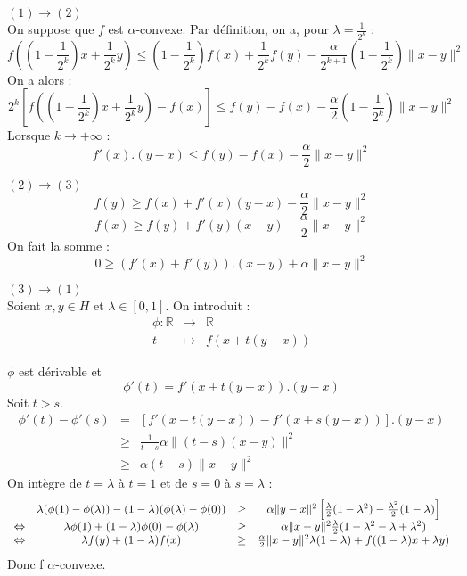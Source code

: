 \begin{dem}
$(1)\to(2)$\\
On suppose que $f$ est $\alpha$-convexe. Par définition, on a, pour $\lambda=\frac{1}{2^k}$ : 
\[f\left(\left(1-\frac{1}{2^k}\right)x+\frac{1}{2^k}y\right)\leq \left(1-\frac{1}{2^k}\right) f(x)+\frac{1}{2^k}f(y)-\frac{\alpha}{2^{k+1}}\left(1-\frac{1}{2^k}\right)\|x-y\|^2\]
On a alors :
\[2^k\left[f\left(\left(1-\frac{1}{2^k}\right)x+\frac{1}{2^k}y\right)-f(x)\right]\leq f(y)-f(x)-\frac{\alpha}{2}\left(1-\frac{1}{2^k}\right)\|x-y\|^2\]
Lorsque $k\to +\infty$ : 
\[f'(x).(y-x)\leq f(y)-f(x)-\frac{\alpha}{2}\|x-y\|^2\]

\bigskip
$(2)\to (3)$\\
\[f(y)\geq f(x)+f'(x)(y-x)-\frac{\alpha}{2}\|x-y\|^2\]
\[f(x)\geq f(y)+f'(y)(x-y)-\frac{\alpha}{2}\|x-y\|^2\]
On fait la somme :
\[0\geq (f'(x)+f'(y)).(x-y)+\alpha\|x-y\|^2\]

\bigskip
$(3)\to(1)$\\
Soient $x,y\in H$ et $\lambda\in[0,1]$. On introduit :
\begin{eqnarray*}
\phi : \mathbb{R}&\to&\mathbb{R}\\
	t&\mapsto&f(x+t(y-x))
\end{eqnarray*}

$\phi$ est dérivable et \[\phi'(t)=f'(x+t(y-x)).(y-x)\]
Soit $t>s$. 
\begin{eqnarray*}
\phi'(t)-\phi'(s)&=&[f'(x+t(y-x))-f'(x+s(y-x))].(y-x) \\
	&\geq& \frac{1}{t-s}\alpha\|(t-s)(x-y)\|^2\\
	&\geq& \alpha(t-s)\|x-y\|^2
\end{eqnarray*}
On intègre de $t=\lambda$ à $t=1$ et de $s=0$ à $s=\lambda$ :
\[\begin{array}{c c c c}
 & \lambda(\phi(1)-\phi(\lambda))-(1-\lambda)(\phi(\lambda)-\phi(0)) &\geq& \alpha\|y-x\|^2\left[ \frac{\lambda}{2} (1-\lambda^2) - \frac{\lambda^2}{2}(1-\lambda)\right]\\
\Leftrightarrow & \lambda\phi(1)+(1-\lambda)\phi(0)-\phi(\lambda) &\geq& \alpha\|x-y\|^2\frac{\lambda}{2}(1-\lambda^2-\lambda+\lambda^2)\\
\Leftrightarrow & \lambda f(y) + (1-\lambda)f(x)&\geq& \frac{\alpha}{2}\|x-y\|^2\lambda(1-\lambda)+f((1-\lambda)x+\lambda y)
\end{array}\]
Donc f $\alpha$-convexe.
\end{dem}


